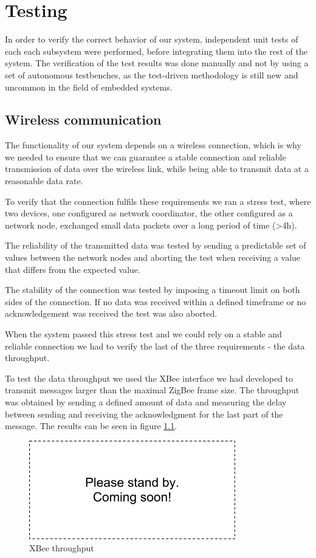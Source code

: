 \chapter{Testing}
In order to verify the correct behavior of our system, independent unit tests of each each subsystem were performed, before integrating them into the rest of the system. The verification of the test results was done manually and not by using a set of autonomous testbenches, as the test-driven methodology is still new and uncommon in the field of embedded systems.

\section{Wireless communication}
\label{sec:wireless_testing}
The functionality of our system depends on a wireless connection, which is why we needed to ensure that we can guarantee a stable connection and reliable transmission of data over the wireless link, while being able to transmit data at a reasonable data rate.

To verify that the connection fulfils these requirements we ran a stress test, where two devices, one configured as network coordinator, the other configured as a network node, exchanged small data packets over a long period of time (>4h). 

The reliability of the transmitted data was tested by sending a predictable set of values between the network nodes and aborting the test when receiving a value that differs from the expected value. 

The stability of the connection was tested by imposing a timeout limit on both sides of the connection. If no data was received within a defined timeframe or no acknowledgement was received the test was also aborted.

When the system passed this stress test and we could rely on a stable and reliable connection we had to verify the last of the three requirements - the data throughput.

To test the data throughput we used the XBee interface we had developed to transmit messages larger than the maximal ZigBee frame size. The throughput was obtained by sending a defined amount of data and measuring the delay between sending and receiving the acknowledgment for the last part of the message. The results can be seen in figure \ref{fig:xbee_throughput}.

\begin{figure}
\centering
\includegraphics[width=0.8\textwidth]{Images/dummy}
\caption{XBee throughput}
\label{fig:xbee_throughput}
\end{figure}

